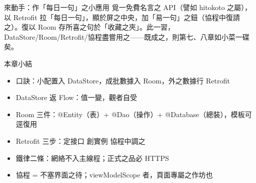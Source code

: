 \begin{tcbpractice}{來動手：作「每日一句」之小應用}
覓一免費名言之 API（譬如 hitokoto 之屬），以 Retrofit 拉「每日一句」，顯於屏之中央，加「易一句」之鈕（協程中復請之）。復以 Room 存所喜之句於「收藏之夾」。此一習，DataStore/Room/Retrofit/協程盡嘗用之——既成之，則第七、八章如小菜一碟矣。

\end{tcbpractice}

\begin{tcbsummary}{本章小結}
\begin{itemize}
  \item 口訣：小配置入 DataStore，成批數據入 Room，外之數據行 Retrofit
  \item DataStore 返 Flow：值一變，觀者自受
  \item Room 三件：@Entity（表）+ @Dao（操作）+ @Database（總裝），模板可逕復用
  \item Retrofit 三步：定接口 創實例 協程中調之
  \item 鐵律二條：網絡不入主線程；正式之品必 HTTPS
  \item 協程 = 不塞界面之待；viewModelScope 者，頁面專屬之作坊也
\end{itemize}

\end{tcbsummary}
